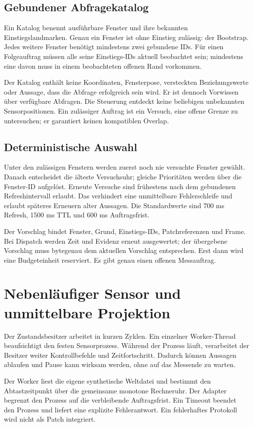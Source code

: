 \documentclass[11pt,a4paper]{article}
\newcommand{\nextsection}[2]{\clearpage{\color{accent}\small\textsf{#1}}\section{#2}}
\begin{document}
\subsection{Gebundener Abfragekatalog}
Ein Katalog benennt ausführbare Fenster und ihre bekannten
Einstiegslandmarken. Genau ein Fenster ist ohne Einstieg zulässig:
der Bootstrap. Jedes weitere Fenster benötigt mindestens zwei
gebundene IDs. Für einen Folgeauftrag müssen alle seine Einstiegs-IDs
aktuell beobachtet sein; mindestens eine davon muss in einem
beobachteten offenen Rand vorkommen.

Der Katalog enthält keine Koordinaten, Fensterpose, versteckten
Beziehungswerte oder Aussage, dass die Abfrage erfolgreich sein wird.
Er ist dennoch Vorwissen über verfügbare Abfragen. Die Steuerung
entdeckt keine beliebigen unbekannten Sensorpositionen. Ein zulässiger
Auftrag ist ein Versuch, eine offene Grenze zu untersuchen; er garantiert
keinen kompatiblen Overlap.

\subsection{Deterministische Auswahl}
Unter den zulässigen Fenstern werden zuerst noch nie versuchte
Fenster gewählt. Danach entscheidet die älteste Versuchsuhr;
gleiche Prioritäten werden über die Fenster-ID aufgelöst. Erneute
Versuche sind frühestens nach dem gebundenen Refreshintervall erlaubt.
Das verhindert eine unmittelbare Fehlerschleife und erlaubt späteres
Erneuern alter Aussagen. Die Standardwerte sind 700 ms Refresh,
1500 ms TTL und 600 ms Auftragsfrist.

Der Vorschlag bindet Fenster, Grund, Einstiegs-IDs, Patchreferenzen
und Frame. Bei Dispatch werden Zeit und Evidenz erneut ausgewertet;
der übergebene Vorschlag muss bytegenau dem aktuellen Vorschlag
entsprechen. Erst dann wird eine Budgeteinheit reserviert.
Es gibt genau einen offenen Messauftrag.

\nextsection{35 / LAUFENDER BETRIEB}{Nebenläufiger Sensor und unmittelbare Projektion}
Der Zustandsbesitzer arbeitet in kurzen Zyklen. Ein einzelner
Worker-Thread beaufsichtigt den festen Sensorprozess. Während der
Prozess läuft, verarbeitet der Besitzer weiter Kontrollbefehle und
Zeitfortschritt. Dadurch können Aussagen ablaufen und Pause kann
wirksam werden, ohne auf das Messende zu warten.

Der Worker liest die eigene synthetische Weltdatei und bestimmt den
Abtastzeitpunkt über die gemeinsame monotone Rechneruhr. Der Adapter
begrenzt den Prozess auf die verbleibende Auftragsfrist. Ein Timeout
beendet den Prozess und liefert eine explizite Fehlerantwort.
Ein fehlerhaftes Protokoll wird nicht als Patch integriert.
\end{document}
